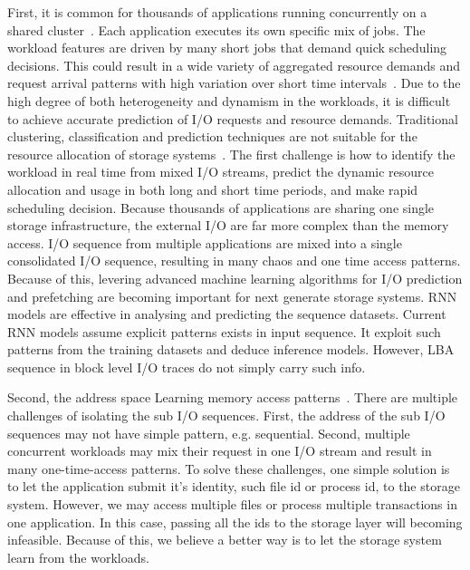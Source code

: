 First, it is common for thousands of applications running concurrently
on a shared cluster~\cite{stokely2012projecting}.
Each application executes its own specific mix of jobs.
The workload features are driven by many short jobs
that demand quick scheduling decisions.
This could result in a wide variety of aggregated resource demands and
request arrival patterns with high variation over short time intervals~\cite{reiss2012heterogeneity}.
Due to the high degree of both heterogeneity and dynamism in the workloads,
it is difficult to achieve accurate prediction of I/O requests and resource demands.
Traditional clustering, classification and prediction techniques
are not suitable for the resource allocation of storage systems~\cite{ray2017high}.
The first challenge is how to identify the workload in real time from mixed I/O streams,
predict the dynamic resource allocation and usage in both long and short time periods,
and make rapid scheduling decision.
Because thousands of applications are sharing one single storage infrastructure,
the external I/O are far more complex than the memory access.
I/O sequence from multiple applications are mixed into a single consolidated I/O sequence,
resulting in many chaos and one time access patterns.
Because of this, levering advanced machine learning algorithms for I/O prediction and prefetching
are becoming important for next generate storage systems.
RNN models are effective in analysing and predicting the sequence datasets.
Current RNN models assume explicit patterns exists in input sequence.
It exploit such patterns from the training datasets and deduce inference models.
However, LBA sequence in block level I/O traces do not simply carry such info.

Second, the address space
Learning memory access patterns~\cite{hashemi2018learning, peled2018towards}.
There are multiple challenges of isolating the sub I/O sequences.
First, the address of the sub I/O sequences may not have simple pattern, e.g. sequential.
Second, multiple concurrent workloads may mix their request in one I/O stream and result in many one-time-access patterns.
To solve these challenges, one simple solution is to let the application submit it's identity, such file id or process id, to the storage system.
However, we may access multiple files or process multiple transactions in one application.
In this case, passing all the ids to the storage layer will becoming infeasible.
Because of this, we believe a better way is to let the storage system learn from the workloads.

